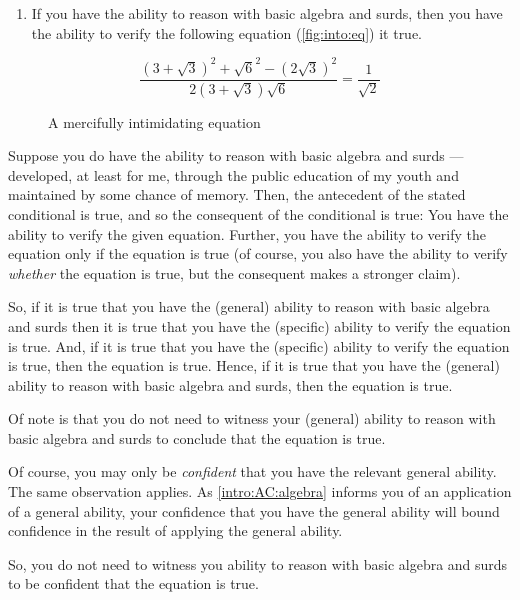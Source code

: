 \begin{note}
  \begin{enumerate}
  \item\label{intro:AC:algebra} If you have the ability to reason with basic algebra and surds, then you have the ability to verify the following equation (\autoref{fig:into:eq}) it true.
  \end{enumerate}

  \begin{figure}[H]
    \[\frac{(3 + \sqrt{3})^{2} + \sqrt{6}^{2} - (2\sqrt{3})^{2}}{2(3 + \sqrt{3})\sqrt{6}} = \frac{1}{\sqrt{2}}\]
    \caption{A mercifully intimidating equation}
    \label{fig:into:eq}
  \end{figure}

  Suppose you do have the ability to reason with basic algebra and surds --- developed, at least for me, through the public education of my youth and maintained by some chance of memory.
  Then, the antecedent of the stated conditional is true, and so the consequent of the conditional is true:
  You have the ability to verify the given equation.
  Further, you have the ability to verify the equation only if the equation is true (of course, you also have the ability to verify \emph{whether} the equation is true, but the consequent makes a stronger claim).

  So, if it is true that you have the (general) ability to reason with basic algebra and surds then it is true that you have the (specific) ability to verify the equation is true.
  And, if it is true that you have the (specific) ability to verify the equation is true, then the equation is true.
  Hence, if it is true that you have the (general) ability to reason with basic algebra and surds, then the equation is true.

  Of note is that you do not need to witness your (general) ability to reason with basic algebra and surds to conclude that the equation is true.

  Of course, you may only be \emph{confident} that you have the relevant general ability.
  The same observation applies.
  As \ref{intro:AC:algebra} informs you of an application of a general ability, your confidence that you have the general ability will bound confidence in the result of applying the general ability.

  So, you do not need to witness you ability to reason with basic algebra and surds to be confident that the equation is true.
\end{note}

